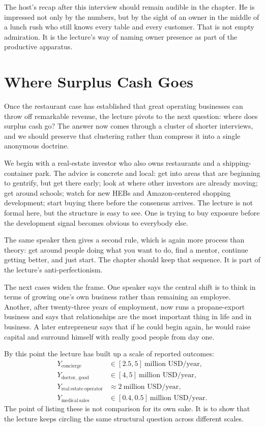 The host's recap after this interview should remain audible in the chapter. He is impressed not only by the numbers, but by the sight of an owner in the middle of a lunch rush who still knows every table and every customer. That is not empty admiration. It is the lecture's way of naming owner presence as part of the productive apparatus.

\section{Where Surplus Cash Goes}

Once the restaurant case has established that great operating businesses can throw off remarkable revenue, the lecture pivots to the next question: where does surplus cash go? The answer now comes through a cluster of shorter interviews, and we should preserve that clustering rather than compress it into a single anonymous doctrine.

We begin with a real-estate investor who also owns restaurants and a shipping-container park. The advice is concrete and local: get into areas that are beginning to gentrify, but get there early; look at where other investors are already moving; get around schools; watch for new HEBs and Amazon-centered shopping development; start buying there before the consensus arrives. The lecture is not formal here, but the structure is easy to see. One is trying to buy exposure before the development signal becomes obvious to everybody else.

The same speaker then gives a second rule, which is again more process than theory: get around people doing what you want to do, find a mentor, continue getting better, and just start. The chapter should keep that sequence. It is part of the lecture's anti-perfectionism.

The next cases widen the frame. One speaker says the central shift is to think in terms of growing one's own business rather than remaining an employee. Another, after twenty-three years of employment, now runs a propane-export business and says that relationships are the most important thing in life and in business. A later entrepreneur says that if he could begin again, he would raise capital and surround himself with really good people from day one.

By this point the lecture has built up a scale of reported outcomes:
\begin{align}
Y_{\mathrm{concierge}} &\in [2.5,5]\ \text{million USD/year},\\
Y_{\mathrm{doctor,\ good}} &\in [4,5]\ \text{million USD/year},\\
Y_{\mathrm{real\ estate\ operator}} &\approx 2\ \text{million USD/year},\\
Y_{\mathrm{medical\ sales}} &\in [0.4,0.5]\ \text{million USD/year}.
\end{align}
The point of listing these is not comparison for its own sake. It is to show that the lecture keeps circling the same structural question across different scales.

